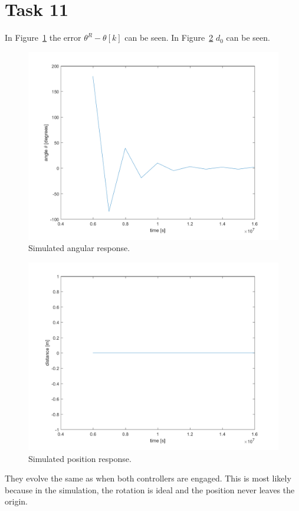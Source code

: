 \documentclass[a4paper,12pt,oneside,onecolumn]{article} %
\begin{document}
\section*{Task 11}
In Figure~\ref{fig:task11_angleplot} the error $\theta^R - \theta[k]$ can be seen. In Figure~\ref{fig:task11_d0plot} $d_0$ can be seen.
\begin{figure}[H]
        \centering
        \includegraphics[scale = 0.5]{../matlab/images/task11_angleplot.png}
        \caption{Simulated angular response.}
        \label{fig:task11_angleplot}
    \end{figure}
    
    \begin{figure}[H]
        \centering
        \includegraphics[scale = 0.5]{../matlab/images/task11_d0plot.png}
        \caption{Simulated position response.}
        \label{fig:task11_d0plot}
    \end{figure}
They evolve the same as when both controllers are engaged. This is most likely because in the simulation, the rotation is ideal and the position never leaves the origin. 
\end{document}
